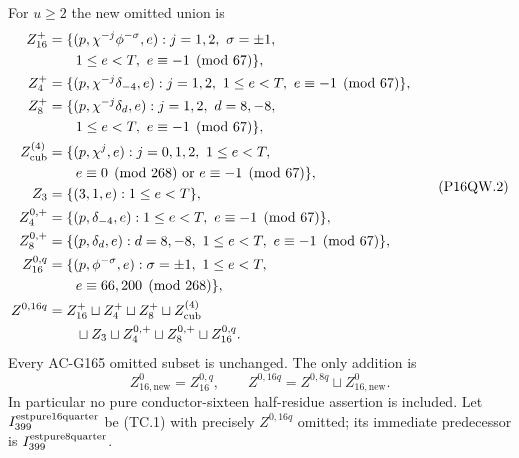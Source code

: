 For $u\geq2$ the new omitted union is
\[
 \begin{aligned}
 Z_{16}^+&=\{(p,\chi^{-j}\phi^{-\sigma},e):j=1,2,\ \sigma=\pm1,\\
 &\hspace{2em}1\leq e<T,\ e\equiv-1\pmod{67}\},\\
 Z_4^+&=\{(p,\chi^{-j}\delta_{-4},e):j=1,2,\ 1\leq e<T,
                                      \ e\equiv-1\pmod{67}\},\\
 Z_8^+&=\{(p,\chi^{-j}\delta_d,e):j=1,2,\ d=8,-8,\\
 &\hspace{2em}1\leq e<T,\ e\equiv-1\pmod{67}\},\\
 Z_{\rm cub}^{(4)}&=\{(p,\chi^j,e):j=0,1,2,\ 1\leq e<T,\\
 &\hspace{2em}e\equiv0\pmod{268}\ \text{or}\ e\equiv-1\pmod{67}\},\\
 Z_3&=\{(3,1,e):1\leq e<T\},\\
 Z_{4}^{0,+}&=\{(p,\delta_{-4},e):1\leq e<T,
                                      \ e\equiv-1\pmod{67}\},\\
 Z_{8}^{0,+}&=\{(p,\delta_d,e):d=8,-8,\ 1\leq e<T,
                                      \ e\equiv-1\pmod{67}\},\\
 Z_{16}^{0,q}&=\{(p,\phi^{-\sigma},e):\sigma=\pm1,\ 1\leq e<T,\\
 &\hspace{2em}e\equiv66,200\pmod{268}\},\\
 Z^{0,16q}&=Z_{16}^+\sqcup Z_4^+\sqcup Z_8^+\sqcup Z_{\rm cub}^{(4)}\\
         &\hspace{2em}\sqcup Z_3\sqcup Z_4^{0,+}\sqcup Z_8^{0,+}\sqcup Z_{16}^{0,q}.
 \end{aligned}
 \tag{P16QW.2}
\]
Every AC-G165 omitted subset is unchanged.  The only addition is
\[
 Z_{16,\mathrm{new}}^0=Z_{16}^{0,q},\qquad
 Z^{0,16q}=Z^{0,8q}\sqcup Z_{16,\mathrm{new}}^0.
 \tag{P16QW.3}
\]
In particular no pure conductor-sixteen half-residue assertion
is included.  Let $I_{399}^{\rm estpure16quarter}$ be (TC.1)
with precisely $Z^{0,16q}$ omitted; its immediate predecessor is
$I_{399}^{\rm estpure8quarter}$.

